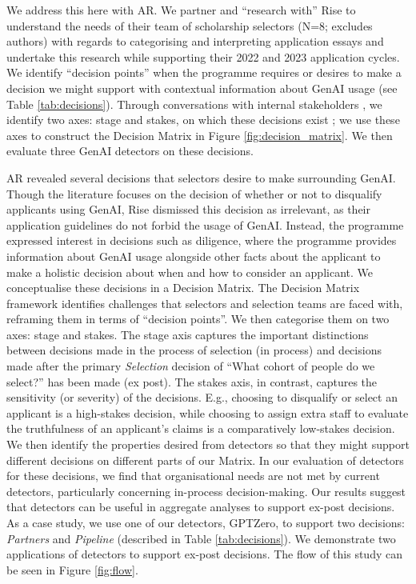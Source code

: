 We address this here with AR. We partner and ``research with'' \cite{bradbury_action_2003} Rise to understand the needs of their team of scholarship selectors (N=8; excludes authors) with regards to categorising and interpreting application essays and undertake this research while supporting their 2022 and 2023 application cycles. We identify ``decision points'' when the programme requires or desires to make a decision we might support with contextual information about GenAI usage (see Table \ref{tab:decisions}). Through conversations with internal stakeholders \cite{Hayes_2011}, we identify two axes: stage and stakes, on which these decisions exist \cite{braun_using_2006}; we use these axes to construct the Decision Matrix in Figure \ref{fig:decision_matrix}. We then evaluate three GenAI detectors on these decisions.

AR revealed several decisions that selectors desire to make surrounding GenAI. Though the literature focuses on the decision of whether or not to disqualify applicants using GenAI, Rise dismissed this decision as irrelevant, as their application guidelines do not forbid the usage of GenAI. Instead, the programme expressed interest in decisions such as diligence, where the programme provides information about GenAI usage alongside other facts about the applicant to make a holistic decision about when and how to consider an applicant. We conceptualise these decisions in a Decision Matrix. The Decision Matrix framework identifies challenges that selectors and selection teams are faced with, reframing them in terms of ``decision points''. We then categorise them on two axes: stage and stakes. The stage axis captures the important distinctions between decisions made in the process of selection (in process) and decisions made after the primary \emph{Selection} decision of ``What cohort of people do we select?'' has been made (ex post). The stakes axis, in contrast, captures the sensitivity (or severity) of the decisions. E.g., choosing to disqualify or select an applicant is a high-stakes decision, while choosing to assign extra staff to evaluate the truthfulness of an applicant's claims is a comparatively low-stakes decision. We then identify the properties desired from detectors so that they might support different decisions on different parts of our Matrix. In our evaluation of detectors for these decisions, we find that organisational needs are not met by current detectors, particularly concerning in-process decision-making. Our results suggest that detectors can be useful in aggregate analyses to support ex-post decisions. As a case study, we use one of our detectors, GPTZero, to support two decisions: \emph{Partners} and \emph{Pipeline} (described in Table \ref{tab:decisions}). We demonstrate two applications of detectors to support ex-post decisions. The flow of this study can be seen in Figure \ref{fig:flow}.

